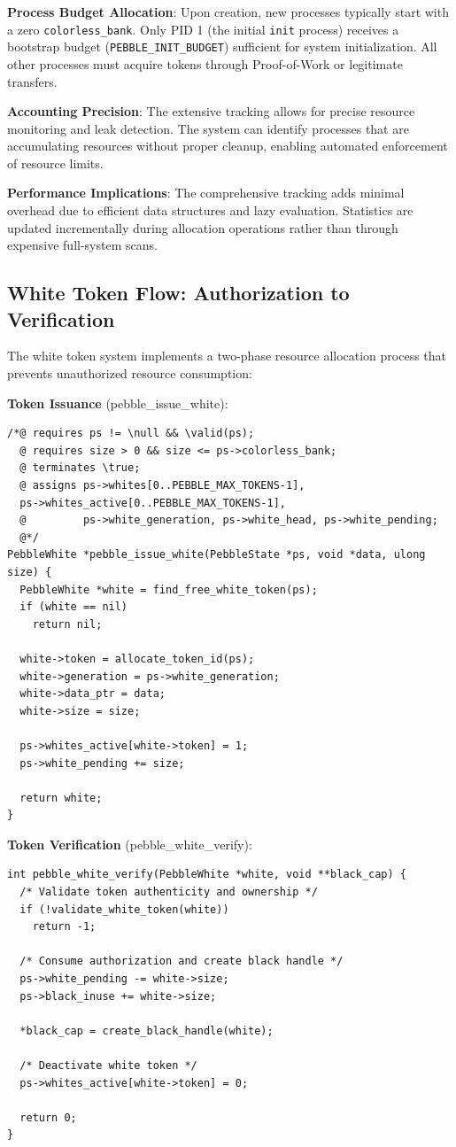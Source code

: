 \documentclass[11pt,letterpaper]{article}
\begin{document}
\textbf{Process Budget Allocation}: Upon creation, new processes typically start with a zero \texttt{colorless_bank}. Only PID 1 (the initial \texttt{init} process) receives a bootstrap budget (\texttt{PEBBLE_INIT_BUDGET}) sufficient for system initialization. All other processes must acquire tokens through Proof-of-Work or legitimate transfers.

\textbf{Accounting Precision}: The extensive tracking allows for precise resource monitoring and leak detection. The system can identify processes that are accumulating resources without proper cleanup, enabling automated enforcement of resource limits.

\textbf{Performance Implications}: The comprehensive tracking adds minimal overhead due to efficient data structures and lazy evaluation. Statistics are updated incrementally during allocation operations rather than through expensive full-system scans.

\subsection{White Token Flow: Authorization to Verification}

The white token system implements a two-phase resource allocation process that prevents unauthorized resource consumption:

\textbf{Token Issuance} (pebble\_issue\_white):

\begin{lstlisting}
/*@ requires ps != \null && \valid(ps);
  @ requires size > 0 && size <= ps->colorless_bank;
  @ terminates \true;
  @ assigns ps->whites[0..PEBBLE_MAX_TOKENS-1],
  ps->whites_active[0..PEBBLE_MAX_TOKENS-1],
  @         ps->white_generation, ps->white_head, ps->white_pending;
  @*/
PebbleWhite *pebble_issue_white(PebbleState *ps, void *data, ulong size) {
  PebbleWhite *white = find_free_white_token(ps);
  if (white == nil)
    return nil;
    
  white->token = allocate_token_id(ps);
  white->generation = ps->white_generation;
  white->data_ptr = data;
  white->size = size;
  
  ps->whites_active[white->token] = 1;
  ps->white_pending += size;
  
  return white;
}
\end{lstlisting}

\textbf{Token Verification} (pebble\_white\_verify):

\begin{lstlisting}
int pebble_white_verify(PebbleWhite *white, void **black_cap) {
  /* Validate token authenticity and ownership */
  if (!validate_white_token(white))
    return -1;
    
  /* Consume authorization and create black handle */
  ps->white_pending -= white->size;
  ps->black_inuse += white->size;
  
  *black_cap = create_black_handle(white);
  
  /* Deactivate white token */
  ps->whites_active[white->token] = 0;
  
  return 0;
}
\end{lstlisting}
\end{document}
